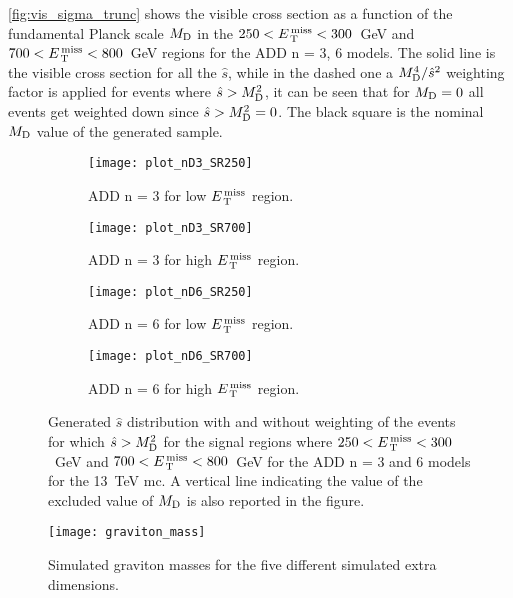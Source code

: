 \cref{fig:vis_sigma_trunc} shows the visible cross section as a function of the
fundamental Planck scale $M_\mathrm{D}$ in the $250 < E_\mathrm{\, T}^\mathrm{\, miss} < 300$~GeV and
$700 < E_\mathrm{\, T}^\mathrm{\, miss} < 800$~GeV regions for the ADD n = 3, 6 models. The solid line is
the visible cross section for all the $\hat{s}$, while in the dashed one a
$M_\mathrm{D}^4/\hat{s}^2$ weighting factor is applied for events where
$\hat{s} > M_\mathrm{D}^2$, it can be seen that for $M_\mathrm{D} = 0$ all events get weighted
down since $\hat{s} > M_\mathrm{D}^2 = 0$. The black square is the nominal $M_\mathrm{D}$ value of
the generated sample.
\begin{figure}[!h]
  \centering
  \begin{subfigure}{.48\linewidth}
    \texttt{[image: plot\_nD3\_SR250]}
    \caption{ADD n = 3 for low $E_\mathrm{\, T}^\mathrm{\, miss}$ region.}
    \label{fig:shat_n3_250}
  \end{subfigure}
  \begin{subfigure}{.48\linewidth}
    \texttt{[image: plot\_nD3\_SR700]}
    \caption{ADD n = 3 for high $E_\mathrm{\, T}^\mathrm{\, miss}$ region.}
    \label{fig:shat_n3_700}
  \end{subfigure}
  \begin{subfigure}{.48\linewidth}
    \texttt{[image: plot\_nD6\_SR250]}
    \caption{ADD n = 6 for low $E_\mathrm{\, T}^\mathrm{\, miss}$ region.}
    \label{fig:shat_n6_250}
  \end{subfigure}
  \begin{subfigure}{.48\linewidth}
    \texttt{[image: plot\_nD6\_SR700]}
    \caption{ADD n = 6 for high $E_\mathrm{\, T}^\mathrm{\, miss}$ region.}
    \label{fig:shat_n6_700}
  \end{subfigure}
  \caption{Generated $\hat{s}$ distribution with and without weighting of the
    events for which $\hat{s} > M_\mathrm{D}^2$ for the signal regions where
    $250 < E_\mathrm{\, T}^\mathrm{\, miss} < 300$~GeV and $700 < E_\mathrm{\, T}^\mathrm{\, miss} < 800$~GeV for the ADD n = 3 and 6
    models for the 13~TeV \gls{mc}. A vertical line indicating the value of the
    excluded value of $M_\mathrm{D}$ is also reported in the figure.}
  \label{fig:shat}
\end{figure}
\begin{figure}[!h]
  \centering
  \texttt{[image: graviton\_mass]}
  \caption{Simulated graviton masses for the five different simulated extra
    dimensions.}
  \label{fig:graviton_mass}
\end{figure}
